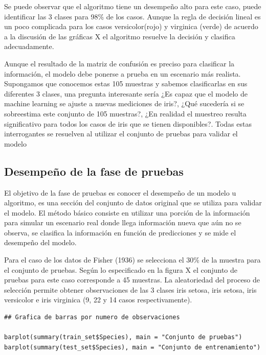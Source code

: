 \documentclass[letterpaper,12pt, spanish, oneside]{book} %
\begin{document}
Se puede observar que el algoritmo tiene un desempeño alto para este caso,  puede identificar las 3 clases para 98\% de los casos. Aunque la regla de decisión lineal es un poco complicada para los casos versicolor(rojo) y virginica (verde) de acuerdo a la discusión de las  gráficas X el algoritmo resuelve la decisión y clasifica adecuadamente.

Aunque el resultado de la matriz de confusión es preciso para clasificar la información, el modelo debe ponerse a prueba en un escenario más realista. Supongamos que conocemos estas 105 muestras y sabemos clasificarlas en sus diferentes 3 clases, una pregunta interesante sería ¿Es capaz que el modelo de machine learning se ajuste a nuevas mediciones de iris?, ¿Qué sucedería si se sobreestima este conjunto de 105 muestras?, ¿En realidad el muestreo resulta significativo para todos los casos de iris que se tienen disponibles?. Todas estas interrogantes se resuelven al utilizar el conjunto de pruebas para validar el modelo

\subsection{Desempeño de la fase de pruebas}

El objetivo de la fase de pruebas es conocer el desempeño de un modelo u algoritmo, es una sección del conjunto de datos original que se utiliza para validar el modelo. El método básico consiste en utilizar una porción de la información para simular un escenario real donde llega información nueva que aún no se observa, se clasifica la información en función de predicciones y se mide el desempeño del modelo.

Para el caso de los datos de Fisher (1936) se selecciona el 30\% de la muestra para el conjunto de pruebas. Según lo especificado en la figura X el conjunto de pruebas para este caso corresponde a 45 muestras. La aleatoriedad del proceso de selección permite obtener observaciones de las 3 clases iris setosa, iris setosa, iris versicolor e iris virginica (9, 22 y 14 casos respectivamente). 

\begin{lstlisting}
## Grafica de barras por numero de observaciones

barplot(summary(train_set$Species), main = "Conjunto de pruebas")
barplot(summary(test_set$Species), main = "Conjunto de entrenamiento")
\end{lstlisting}
\end{document}
